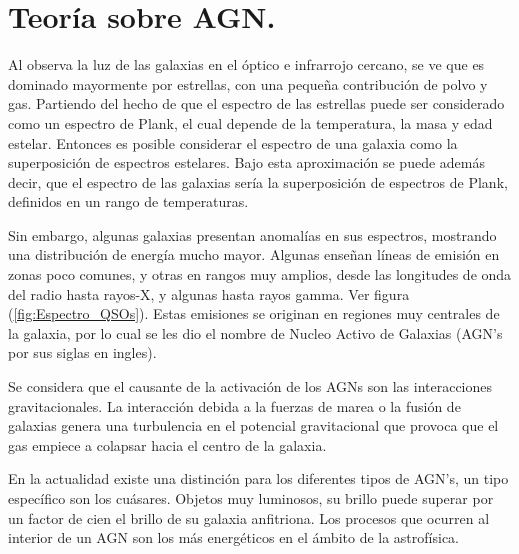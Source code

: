\begin{savequote}[50mm]
\end{savequote}




\chapter{Teoría sobre AGN.}
\label{cha:Theoretical Framework}


Al observa la luz de las galaxias en el óptico e infrarrojo cercano, se ve que es dominado mayormente por estrellas, con una pequeña contribución de polvo y gas. Partiendo del hecho de que el espectro de las estrellas puede ser considerado como un espectro de Plank, el cual depende de la temperatura, la masa y edad estelar. Entonces es posible considerar el espectro de una galaxia como la superposición de espectros  estelares. Bajo esta aproximación se puede además decir, que el espectro de las galaxias sería la superposición de espectros de Plank, definidos en un rango de temperaturas.

Sin embargo, algunas galaxias presentan anomalías en sus espectros,  mostrando una distribución de energía mucho mayor. Algunas enseñan líneas de emisión en zonas poco comunes, y otras en rangos muy amplios, desde las longitudes de onda del radio hasta rayos-X, y algunas hasta rayos gamma. Ver figura (\ref{fig:Espectro_QSOs}). Estas emisiones se originan en regiones muy centrales de la galaxia, por lo cual se les dio el nombre de Nucleo Activo de Galaxias (AGN's por sus siglas en ingles).

Se considera que el causante de la activación de los AGNs son las interacciones gravitacionales. La interacción debida a la fuerzas de marea o la fusión de galaxias genera una turbulencia en el potencial gravitacional que provoca que el gas empiece a colapsar hacia el centro de la galaxia. 

En la actualidad existe una distinción para los diferentes tipos de  AGN's, un tipo específico son los cuásares. Objetos muy luminosos, su brillo puede superar por un factor de cien el brillo de su galaxia anfitriona. Los procesos que ocurren al interior de un AGN son los más energéticos en el ámbito de la astrofísica. 


